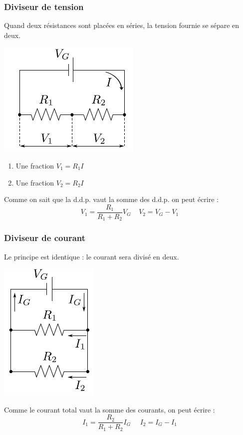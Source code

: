 \documentclass	[11pt, a4paper, openany]{book}
\begin{document}
		\subsubsection*{Diviseur de tension}
		Quand deux résistances sont placées en séries, la tension fournie se sépare en deux.
		\begin{center}
			\includegraphics[scale=0.5]{labo/image9.png}
		\end{center}
		\begin{enumerate}
			\item Une fraction $V_1 = R_1I$
			\item Une fraction $V_2 = R_2I$
		\end{enumerate}
		Comme on sait que la d.d.p. vaut la somme des d.d.p. on peut écrire : 
		\begin{equation}
			V_1 = \frac{R_1}{R_1 + R_2}V_G\ \ \ \ \ V_2 = V_G - V_1
		\end{equation}
		
		\subsubsection*{Diviseur de courant}
		Le principe est identique : le courant sera divisé en deux.
		\begin{center}
			\includegraphics[scale=0.5]{labo/image10.png}
		\end{center}
		Comme le courant total vaut la somme des courants, on peut écrire : 
		\begin{equation}
			I_1 = \frac{R_2}{R_1 + R_2}I_G\ \ \ \ \ \ I_2 = I_G - I_1
		\end{equation}
		
\end{document}
